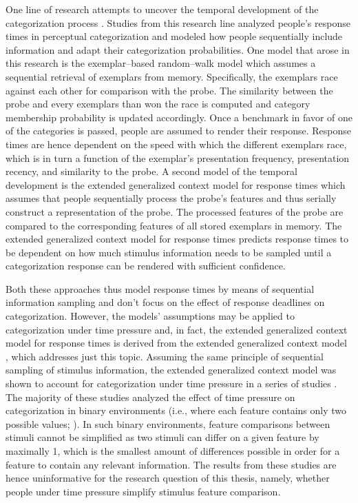 \documentclass[a4paper,man,natbib]{apa6}
\begin{document}
One line of research attempts to uncover the temporal development of the categorization process \citep{lamberts2000information, lamberts2002feature, nosofsky1997exemplar}. Studies from this research line analyzed people's response times in perceptual categorization and modeled how people sequentially include information and adapt their categorization probabilities. One model that arose in this research is the exemplar--based random--walk model \citep{nosofsky1997exemplar} which assumes a sequential retrieval of exemplars from memory. Specifically, the exemplars race against each other for comparison with the probe. The similarity between the probe and every exemplars than won the race is computed and category membership probability is updated accordingly. Once a benchmark in favor of one of the categories is passed, people are assumed to render their response. Response times are hence dependent on the speed with which the different exemplars race, which is in turn a function of the exemplar's presentation frequency, presentation recency, and similarity to the probe. A second model of the temporal development is the extended generalized context model for response times \citep{lamberts2000information, lamberts2002feature} which assumes that people sequentially process the probe's features and thus serially construct a representation of the probe. The processed features of the probe are compared to the corresponding features of all stored exemplars in memory. The extended generalized context model for response times predicts response times to be dependent on how much stimulus information needs to be sampled until a categorization response can be rendered with sufficient confidence.

Both these approaches thus model response times by means of sequential information sampling and don't focus on the effect of response deadlines on categorization. However, the models' assumptions may be applied to categorization under time pressure and, in fact, the extended generalized context model for response times is derived from the extended generalized context model \citep{lamberts1995categorization}, which addresses just this topic. Assuming the same principle of sequential sampling of stimulus information, the extended generalized context model was shown to account for categorization under time pressure in a series of studies \citep{lamberts1995categorization, lamberts1998time, lamberts1999building, lamberts1999categorization, lamberts1997fast}. 
The majority of these studies analyzed the effect of time pressure on categorization in binary environments (i.e., where each feature contains only two possible values; \citealp{lamberts1995categorization, lamberts1998time, lamberts1999building, lamberts1999categorization}). In such binary environments, feature comparisons between stimuli cannot be simplified as two stimuli can differ on a given feature by maximally 1, which is the smallest amount of differences possible in order for a feature to contain any relevant information. The results from these studies are hence uninformative for the research question of this thesis, namely, whether people under time pressure simplify stimulus feature comparison. 
\end{document}
